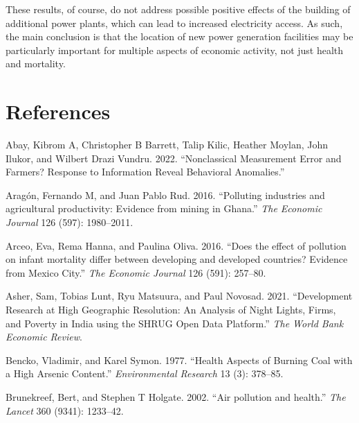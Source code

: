 \documentclass[
]{article}
\newlength{\cslhangindent}
\newlength{\cslentryspacingunit} %
\newenvironment{CSLReferences}[2] %
 {%
  \setlength{\parindent}{0pt}
  \ifodd #1
  \let\oldpar\par
  \def\par{\hangindent=\cslhangindent\oldpar}
  \fi
  \setlength{\parskip}{#2\cslentryspacingunit}
 }%
 {}
\begin{document}
These results, of course, do not address possible positive effects of the building of additional power plants, which can lead to increased electricity access. As such, the main conclusion is that the location of new power generation facilities may be particularly important for multiple aspects of economic activity, not just health and mortality.

\FloatBarrier
\newpage
\singlespacing

\hypertarget{references}{%
\section*{References}\label{references}}

\hypertarget{refs}{}
\begin{CSLReferences}{1}{0}
\leavevmode{}%
Abay, Kibrom A, Christopher B Barrett, Talip Kilic, Heather Moylan, John Ilukor, and Wilbert Drazi Vundru. 2022. {``{Nonclassical Measurement Error and Farmers? Response to Information Reveal Behavioral Anomalies}.''}

\leavevmode{}%
Aragón, Fernando M, and Juan Pablo Rud. 2016. {``{Polluting industries and agricultural productivity: Evidence from mining in Ghana}.''} \emph{{The Economic Journal}} 126 (597): 1980--2011.

\leavevmode{}%
Arceo, Eva, Rema Hanna, and Paulina Oliva. 2016. {``{Does the effect of pollution on infant mortality differ between developing and developed countries? Evidence from Mexico City}.''} \emph{{The Economic Journal}} 126 (591): 257--80.

\leavevmode{}%
Asher, Sam, Tobias Lunt, Ryu Matsuura, and Paul Novosad. 2021. {``{Development Research at High Geographic Resolution: An Analysis of Night Lights, Firms, and Poverty in India using the SHRUG Open Data Platform}.''} \emph{{The World Bank Economic Review}}.

\leavevmode{}%
Bencko, Vladimir, and Karel Symon. 1977. {``Health Aspects of Burning Coal with a High Arsenic Content.''} \emph{{Environmental Research}} 13 (3): 378--85.

\leavevmode{}%
Brunekreef, Bert, and Stephen T Holgate. 2002. {``{Air pollution and health}.''} \emph{{The Lancet}} 360 (9341): 1233--42.


\end{CSLReferences}
\end{document}
